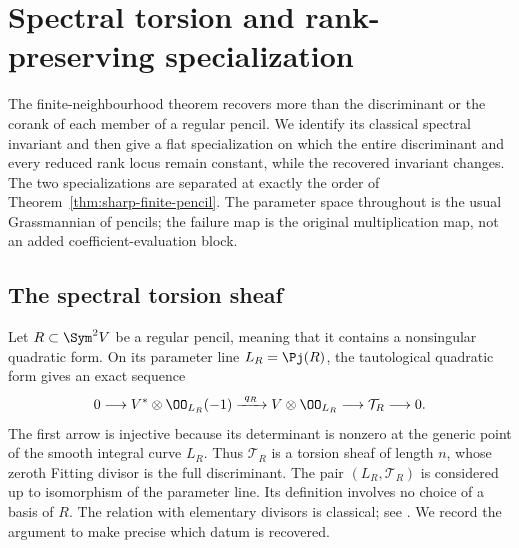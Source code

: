 \section{Spectral torsion and rank-preserving specialization}
\label{sec:spectral-specialization}

The finite-neighbourhood theorem recovers more than the discriminant
or the corank of each member of a regular pencil.  We identify its
classical spectral invariant and then give a flat specialization on
which the entire discriminant and every reduced rank locus remain
constant, while the recovered invariant changes.  The two specializations
are separated at exactly the order of Theorem~\ref{thm:sharp-finite-pencil}.
The parameter space throughout is the usual Grassmannian of pencils;
the failure map is the original multiplication map, not an added
coefficient-evaluation block.

\subsection{The spectral torsion sheaf}

Let \(R\subset\Sym^2V\) be a regular pencil, meaning that it
contains a nonsingular quadratic form.  On its parameter line
\(L_R=\Pj(R)\), the tautological quadratic form gives an exact sequence
\begin{equation}\label{eq:spectral-torsion-sequence}
 0\longrightarrow V^*\otimes\OO_{L_R}(-1)
 \xrightarrow{\ q_R\ }V\otimes\OO_{L_R}
 \longrightarrow\mathcal T_R\longrightarrow0.
\end{equation}
The first arrow is injective because its determinant is nonzero at the
generic point of the smooth integral curve \(L_R\).  Thus
\(\mathcal T_R\) is a torsion sheaf of length \(n\), whose
zeroth Fitting divisor is the full discriminant.  The pair
\((L_R,\mathcal T_R)\) is considered up to isomorphism of the
parameter line.  Its definition involves no choice of a basis of \(R\).
The relation with elementary divisors is classical; see
\cite[\S2, Corollary~2.1 and equation~(5)]{FevolaMandelshtamSturmfels}.
We record the argument to make precise which datum is recovered.

